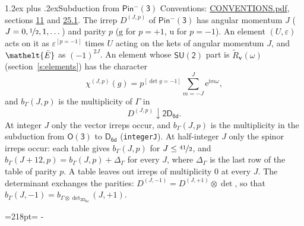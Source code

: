 \documentclass[10pt,a4paper]{article}
\makeatletter
\renewcommand\section{\@startsection{section}{1}{\z@}{-3ex plus -1ex minus -.2ex}%
  {1.2ex plus .2ex}{\normalfont\large\sffamily\bfseries\color{parttitle}}}
\newcommand{\needspace}[1]{\par\penalty-100\begingroup\dimen0=#1\relax\dimen2=\pagegoal
  \advance\dimen2-\pagetotal\ifdim\dimen0>\dimen2\relax\ifdim\dimen2>0pt\vfil\break\fi\fi
  \endgroup}
\numberwithin{equation}{section}
\newcommand{\eltfont}[1]{{\let\sigma\eltsigma\mathelt{#1}}}
\newcommand{\grp}[1]{\mathsf{#1}}
\newcommand{\elt}[1]{\eltfont{#1}}
\newcommand{\ptag}[1]{\mathrm{#1}}
\newcommand{\iverson}[1]{[#1]}
\newcommand{\restr}[2]{#1\!\downarrow#2}
\newcommand{\vv}{\mathbf{v}}
\newcommand{\iunit}{\mathrm{i}}
\newcommand{\expe}{\mathrm{e}}
\newcommand{\irrJp}[2]{D^{(#1,#2)}}
\newcommand{\irrprod}{\otimes}
\newcommand{\barred}[1]{\bar{#1}}
\newcommand{\lift}[1]{\tilde{#1}}
\makeatother
\begin{document}
\section{Subduction from \texorpdfstring{$\grp{Pin^{-}(3)}$}{Pin(3)}}\label{s:subduction_parent}
Conventions: \href{../../CONVENTIONS.pdf}{CONVENTIONS.pdf}, sections \href{../../../rotation/CONVENTIONS.pdf\#conv.11}{11} and \href{../../CONVENTIONS.pdf\#conv.25.1}{25.1}.
\leavevmode\label{n:index.J}\label{n:index.parity}\label{n:irrep.o3}The irrep $\irrJp{J}{p}$ of \href{Pinminus3.pdf}{$\grp{Pin^{-}(3)}$} has angular momentum $J$ ($J = 0, \nicefrac{1}{2}, 1, \dots$) and parity $p$ ($\ptag{g}$ for $p = +1$, $\ptag{u}$ for $p = -1$). An element $(U, \varepsilon)$ acts on it as $\varepsilon^{[p = -1]}$ times $U$ acting on the kets of angular momentum $J$, and $\elt{\barred{E}}$ as $(-1)^{2J}$. \label{n:function.character.parent}\label{n:function.multiplicity}An element whose $\grp{SU(2)}$ part is $\lift{R}_{\vv}(\omega)$ (section~\ref{s:elements}) has the character
\begin{equation}\label{e:chi}\chi^{(J,p)}(g) = p^{\iverson{\det g = -1}}\sum_{m=-J}^{J} \expe^{\iunit m\omega},\end{equation}
and $b_\Gamma(J, p)$ is the multiplicity of $\Gamma$ in
\begin{equation}\label{e:parent}\restr{\irrJp{J}{p}}{\grp{2D_{6d}}}.\end{equation}
At integer $J$ only the vector irreps occur, and $b_\Gamma(J, p)$ is the multiplicity in the subduction from $\grp{O(3)}$ to \href{../../../rotation/data/pdf/D6d.pdf}{$\grp{D_{6d}}$} (\texttt{integerJ}). \label{n:index.increment}At half-integer $J$ only the spinor irreps occur: each table gives $b_\Gamma(J, p)$ for $J \le \nicefrac{41}{2}$, and $b_\Gamma(J + 12, p) = b_\Gamma(J, p) + \Delta_\Gamma$ for every $J$, where $\Delta_\Gamma$ is the last row of the table of parity $p$. A table leaves out irreps of multiplicity 0 at every $J$.
\leavevmode\label{n:operator.determinant.character}The determinant exchanges the parities: $\irrJp{J}{-1} = \irrJp{J}{+1} \irrprod \det$, so that $b_\Gamma(J, -1) = b_{\Gamma \irrprod \det_{\grp{2D_{6d}}}}(J, +1)$.
\needspace{218pt}
\end{document}
